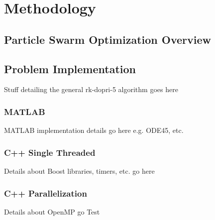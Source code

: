 \chapter{Methodology}

\section{Particle Swarm Optimization Overview}
\section{Problem Implementation}
Stuff detailing the general rk-dopri-5 algorithm goes here
\subsection{MATLAB}
MATLAB implementation details go here e.g. ODE45, etc.
\subsection{C++ Single Threaded}
Details about Boost libraries, timers, etc. go here
\subsection{C++ Parallelization}
Details about OpenMP go Test

\newpage